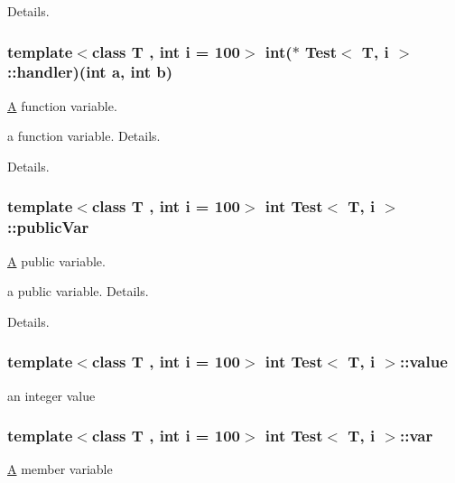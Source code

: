 Details. \hypertarget{class_test_a2ce50e60d16f5071772c6acde08181bd}{
\subsubsection[{handler}]{\setlength{\rightskip}{0pt plus 5cm}template$<$class T , int i = 100$>$ int($\ast$ {\bf Test}$<$ T, i $>$\-::handler)(int a, int b)}}\label{class_test_a2ce50e60d16f5071772c6acde08181bd}


\hyperlink{class_a}{A} function variable. 

a function variable. Details.

Details. \hypertarget{class_test_aba22fd8dcb6ca747e2266fadaf5bc383}{
\subsubsection[{public\-Var}]{\setlength{\rightskip}{0pt plus 5cm}template$<$class T , int i = 100$>$ int {\bf Test}$<$ T, i $>$\-::public\-Var}}\label{class_test_aba22fd8dcb6ca747e2266fadaf5bc383}


\hyperlink{class_a}{A} public variable. 

a public variable. Details.

Details. \hypertarget{class_test_aefcbb7ead19f2c28a71a3a3f26cef6cb}{
\subsubsection[{value}]{\setlength{\rightskip}{0pt plus 5cm}template$<$class T , int i = 100$>$ int {\bf Test}$<$ T, i $>$\-::value\hspace{0.3cm}{\ttfamily [protected]}}}\label{class_test_aefcbb7ead19f2c28a71a3a3f26cef6cb}
an integer value \hypertarget{class_test_ae75d55c8cf6390227d51c0965a4de296}{
\subsubsection[{var}]{\setlength{\rightskip}{0pt plus 5cm}template$<$class T , int i = 100$>$ int {\bf Test}$<$ T, i $>$\-::var\hspace{0.3cm}{\ttfamily [protected]}}}\label{class_test_ae75d55c8cf6390227d51c0965a4de296}
\hyperlink{class_a}{A} member variable 

